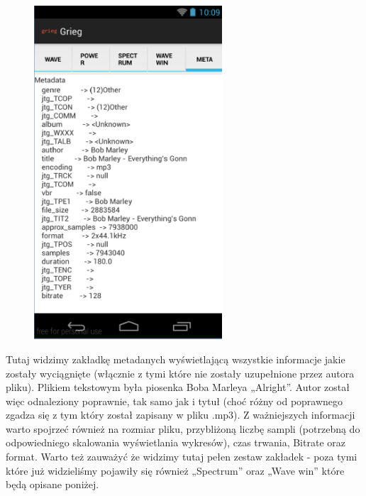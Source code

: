 \begin{figure}[H]
  \centering
  \includegraphics[width=7cm]{images/full_metadata}
\end{figure}

Tutaj widzimy zakładkę metadanych wyświetlającą wszystkie informacje jakie zostały wyciągnięte
(włącznie z tymi które nie zostały uzupełnione przez autora pliku). Plikiem tekstowym była piosenka
Boba Marleya „Alright”. Autor został więc odnaleziony poprawnie, tak samo jak i tytuł (choć różny od
poprawnego zgadza się z tym który został zapisany w pliku .mp3). Z ważniejszych informacji warto
spojrzeć również na rozmiar pliku, przybliżoną liczbę sampli (potrzebną do odpowiedniego skalowania
wyświetlania wykresów), czas trwania, Bitrate oraz format.  Warto też zauważyć że widzimy tutaj
pełen zestaw zakładek - poza tymi które już widzieliśmy pojawiły się również „Spectrum” oraz „Wave
win” które będą opisane poniżej.


